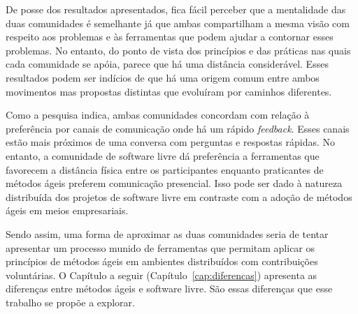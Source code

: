 De posse dos resultados apresentados, fica fácil perceber que a
mentalidade das duas comunidades é semelhante já que ambas
compartilham a mesma visão com respeito aos problemas e às ferramentas
que podem ajudar a contornar esses problemas. No entanto, do ponto de
vista dos princípios e das práticas nas quais cada comunidade se
apóia, parece que há uma distância considerável. Esses resultados
podem ser indícios de que há uma origem comum entre ambos movimentos
mas propostas distintas que evoluíram por caminhos diferentes.

Como a pesquisa indica, ambas comunidades concordam com relação à
preferência por canais de comunicação onde há um rápido
\textit{feedback}. Esses canais estão mais próximos de uma conversa
com perguntas e respostas rápidas. No entanto, a comunidade de
software livre dá preferência a ferramentas que favorecem a distância
física entre os participantes enquanto praticantes de métodos ágeis
preferem comunicação presencial. Isso pode ser dado à natureza
distribuída dos projetos de software livre em contraste com a adoção
de métodos ágeis em meios empresariais.

Sendo assim, uma forma de aproximar as duas comunidades seria de
tentar apresentar um processo munido de ferramentas que permitam
aplicar os princípios de métodos ágeis em ambientes distribuídos com
contribuições voluntárias. O Capítulo a seguir
(Capítulo~\ref{cap:diferencas}) apresenta as diferenças entre métodos
ágeis e software livre. São essas diferenças que esse trabalho se
propõe a explorar.

